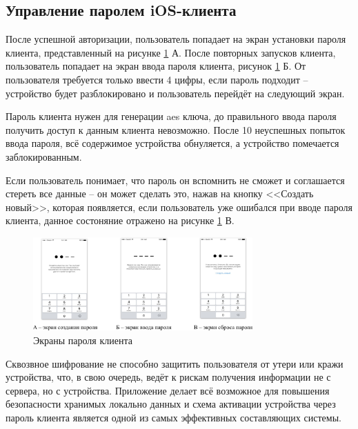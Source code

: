 \subsection{Управление паролем iOS-клиента}
\label{sec:usage:pin}

После успешной авторизации, пользователь попадает на экран установки пароля клиента, представленный на рисунке \ref{sec:usage:pin:ui} А. После повторных запусков клиента, пользователь попадает на экран ввода пароля клиента, рисунок \ref{sec:usage:pin:ui} Б. От пользователя требуется только ввести 4 цифры, если пароль подходит -- устройство будет разблокировано и пользователь перейдёт на следующий экран.

Пароль клиента нужен для генерации \gls{aes} ключа, до правильного ввода пароля получить доступ к данным клиента невозможно. После 10 неуспешных попыток ввода пароля, всё содержимое устройства обнуляется, а устройство помечается заблокированным.

Если пользователь понимает, что пароль он вспомнить не сможет и соглашается стереть все данные -- он может сделать это, нажав на кнопку <<Создать новый>>, которая появляется, если пользователь уже ошибался при вводе пароля клиента, данное состоняние отражено на рисунке \ref{sec:usage:pin:ui} В.

\begin{figure}[h]
  \centering
    \includegraphics[width=0.75\textwidth]{inc/img/ui/pin_combined.jpg}
  \caption{Экраны пароля клиента}
  \label{sec:usage:pin:ui}
\end{figure}

Сквозвное шифрование не способно защитить пользователя от утери или кражи устройства, что, в свою очередь, ведёт к рискам получения информации не с сервера, но с устройства. Приложение делает всё возможное для повышения безопасности хранимых локально данных и схема активации устройства через пароль клиента является одной из самых эффективных составляющих системы.